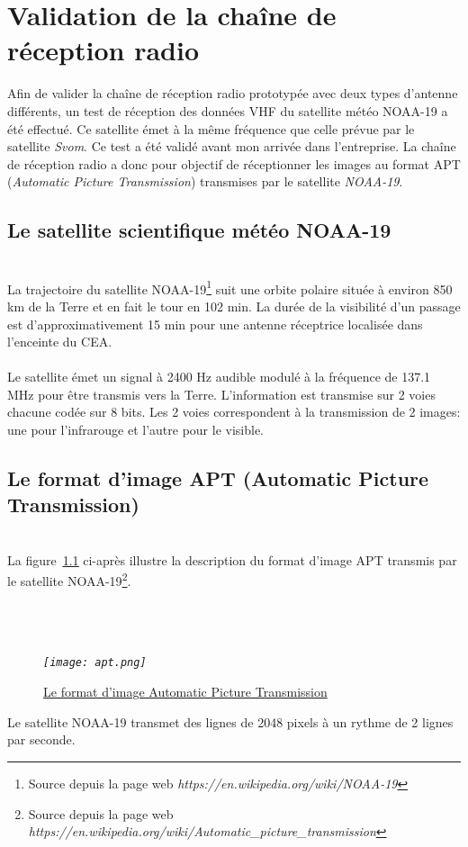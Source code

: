 \documentclass[12pt,fleqn]{book} %
\begin{document}
\chapter{Validation de la chaîne de réception radio}
Afin de valider la chaîne de réception radio prototypée avec deux types d'antenne différents, un test de réception des données VHF du satellite météo NOAA-19 a été effectué. Ce satellite émet à la même fréquence que celle prévue par le satellite \emph{Svom}. Ce test a été validé avant mon arrivée dans l'entreprise.
La chaîne de réception radio a donc pour objectif de réceptionner les images au format APT (\emph{Automatic Picture Transmission}) transmises par le satellite \emph{NOAA-19}.
\section{Le satellite scientifique météo NOAA-19}
~\\\indent La trajectoire du satellite NOAA-19\footnote{Source depuis la page web \emph{https://en.wikipedia.org/wiki/NOAA-19}} suit une orbite polaire située à environ 850 km de la Terre et en fait le tour en 102 min. La durée de la visibilité d'un passage est d'approximativement 15 min pour une antenne réceptrice localisée dans l'enceinte du CEA.
~\\\\Le satellite émet un signal à 2400 Hz audible modulé à la fréquence de 137.1 MHz pour être transmis vers la Terre. L'information est transmise sur 2 voies chacune codée sur 8 bits. Les 2 voies correspondent à la transmission de 2 images: une pour l'infrarouge et l'autre pour le visible.
\section{Le format d'image APT (Automatic Picture Transmission)}
~\\\indent La figure~\underline{\color{blue}\ref{apt}} ci-après illustre la description du format d'image APT transmis par le satellite NOAA-19\footnote{Source depuis la page web \emph{https://en.wikipedia.org/wiki/Automatic\_picture\_transmission}}.
~\\\\
~\\\\
\begin{figure}[H]
	\centering
	\itshape
	\texttt{[image: apt.png]}
	\caption{\label{apt} \underline{Le format d'image Automatic Picture Transmission}}
\end{figure}
Le satellite NOAA-19 transmet des lignes de 2048 pixels à un rythme de 2 lignes par seconde.
\end{document}
